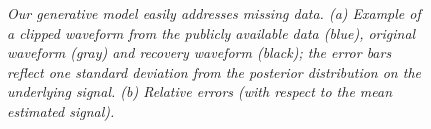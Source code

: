 \documentclass[journal]{IEEEtran}
\begin{document}

\begin{figure}[!htbp]
\centering
{} 
  \caption{\small \emph{ Our generative model easily addresses missing data.
(a) Example of a clipped waveform from the publicly available data (blue), original waveform (gray) and
  recovery waveform (black); the error bars reflect one standard deviation from the posterior distribution on the underlying signal. (b) Relative errors (with respect to the mean estimated signal).
   }}
\end{figure}
\end{document}
